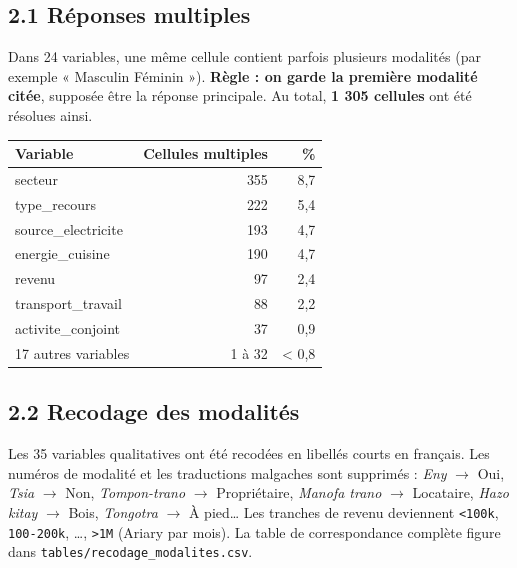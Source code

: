 \documentclass[

  french,

  10pt,

  a4paper,

]{article}
\newcounter{none} %
\begin{document}
\subsection{2.1 Réponses multiples}



Dans 24 variables, une même cellule contient parfois plusieurs modalités (par exemple « Masculin Féminin »). \textbf{Règle : on garde la première modalité citée}, supposée être la réponse principale. Au total, \textbf{1 305 cellules} ont été résolues ainsi.



{\def\LTcaptype{none} %

\begin{longtable}[]{@{}lrr@{}}

\toprule\noalign{}

Variable & Cellules multiples & \% \\

\midrule\noalign{}

\endhead

\bottomrule\noalign{}

\endlastfoot

secteur & 355 & 8,7 \\

type\_recours & 222 & 5,4 \\

source\_electricite & 193 & 4,7 \\

energie\_cuisine & 190 & 4,7 \\

revenu & 97 & 2,4 \\

transport\_travail & 88 & 2,2 \\

activite\_conjoint & 37 & 0,9 \\

17 autres variables & 1 à 32 & \textless{} 0,8 \\

\end{longtable}

}



\subsection{2.2 Recodage des modalités}



Les 35 variables qualitatives ont été recodées en libellés courts en français. Les numéros de modalité et les traductions malgaches sont supprimés : \emph{Eny} \ensuremath{\rightarrow} Oui, \emph{Tsia} \ensuremath{\rightarrow} Non, \emph{Tompon-trano} \ensuremath{\rightarrow} Propriétaire, \emph{Manofa trano} \ensuremath{\rightarrow} Locataire, \emph{Hazo kitay} \ensuremath{\rightarrow} Bois, \emph{Tongotra} \ensuremath{\rightarrow} À pied\ldots{} Les tranches de revenu deviennent \texttt{\textless{}100k}, \texttt{100-200k}, \ldots, \texttt{\textgreater{}1M} (Ariary par mois). La table de correspondance complète figure dans \texttt{tables/recodage\_modalites.csv}.
\end{document}
